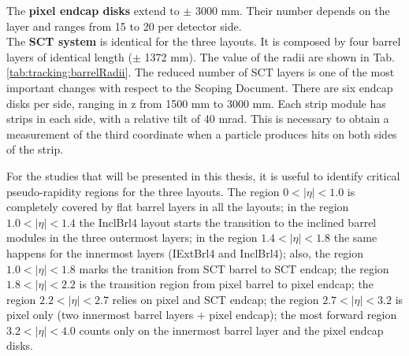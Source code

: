 \documentclass[a4paper,twoside,12pt]{book}
\begin{document}
The \textbf{pixel endcap disks} extend to $\pm$ 3000 mm. Their 
number depends on the layer and ranges from 15 to 20 per detector side. \\

The \textbf{SCT system} is identical for the three layouts. It is composed by four barrel layers of identical length ($\pm$ 1372 mm). The value of the radii are shown in Tab.
\ref{tab:tracking:barrelRadii}. The reduced number of SCT layers is one of the most important changes
with respect to the Scoping Document\cite{scoping}. There
are six endcap disks per side, ranging in z from 1500 mm to 3000 mm. Each strip module
has strips in each side, with a relative tilt of 40 mrad. This is necessary to obtain a
measurement of the third coordinate when a particle produces hits on both sides of the
strip.\\

\begin{table} [h]
\centering
	\caption{For the three Step-1 layouts considered, values of the barrel layers radii in the Pixel and SCT layers. $^*$The second pixel layer is 75 mm only for the ExtBrl4 layout, and is 
	85 mm in the IExtBrl4 and InclBrl4 layouts.}
	\label{tab:tracking:barrelRadii}
\end{table}

For the studies that will be presented in this thesis, it is useful to identify critical pseudo-rapidity regions for the three layouts. The region $0 < |\eta| < 1.0$ is completely covered by
flat barrel layers in all the layouts; in the region $1.0 < |\eta| < 1.4$ the InclBrl4 layout starts the transition to the inclined barrel modules in the three outermost layers; in the
region $1.4 < |\eta| < 1.8$ the same happens for the innermost layers (IExtBrl4 and InclBrl4); also, the region $1.0 < |\eta| < 1.8$ marks the tranition from SCT barrel to SCT endcap; the region $1.8 < |\eta| < 2.2$ is the transition region from pixel barrel to pixel endcap; the region $2.2 < |\eta| < 2.7$ relies on pixel and SCT endcap; the region $2.7 < |\eta| < 3.2$  is pixel only (two innermost barrel layers + pixel endcap); the most forward region $3.2 < |\eta| < 4.0$ counts only on the innermost barrel layer and the pixel endcap disks.\\
\end{document}
